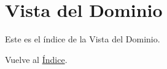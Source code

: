 \newpage
\section{Vista del Dominio}
Este es el índice de la Vista del Dominio.

Vuelve al \hyperlink{toc}{Índice}.